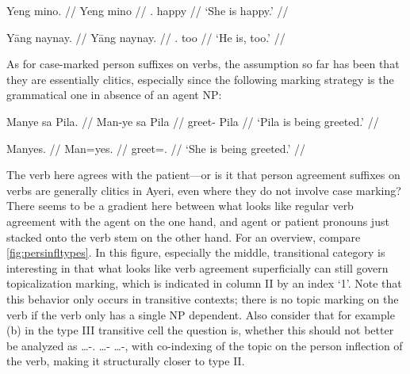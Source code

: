 \pex %
\a\begingl
	\gla Yeng mino. //
	\glb Yeng mino //
	\glc \TsgF{}.\Aarg{} happy //
	\glft `She is happy.' //
\endgl
	
\a\begingl
	\gla Yāng naynay. //
	\glb Yāng naynay. //
	\glc \TsgM{}.\Aarg{} too //
	\glft `He is, too.' //
\endgl

\xe

\label{patagr}
As for case-marked person suffixes on verbs, the assumption so far has been 
that they are essentially clitics, especially since the following marking 
strategy is the grammatical one in absence of an agent NP:

\pex\label{ex:passive} %
\a\label{ex:manye}\begingl
	\gla Manye sa Pila. //
	\glb Man-ye sa ​Pila //
	\glc greet-\TsgF{} \Parg{} ​Pila //
	\glft `Pila is being greeted.' //
\endgl
	
\a\label{ex:manyes}\begingl
	\gla Manyes. //
	\glb Man=yes. //
	\glc greet=\TsgF{}.\Parg{} //
	\glft `She is being greeted.' //
\endgl

\xe

The verb here agrees with the patient---or is it that person agreement suffixes
on verbs are generally clitics in Ayeri, even where they do not involve case
marking? There seems to be a gradient here between what looks like regular verb
agreement with the agent on the one hand, and agent or patient pronouns just
stacked onto the verb stem on the other hand. For an overview, compare
\autoref{fig:persinfltypes}. In this figure, especially the middle,
transitional category is interesting in that what looks like verb agreement
superficially can still govern topicalization marking, which is indicated in
column II by an index `1'. Note that this behavior only occurs in transitive
contexts; there is no topic marking on the verb if the verb only has a single
NP dependent. Also consider that for example (b) in the type III transitive
cell the question is, whether this should not better be analyzed as
\AgtT{} …-\TsgM{}.\Top{} …-\Top{} …-\Parg{}, with co-indexing of the topic on 
the person inflection of the verb, making it structurally closer to type II.


